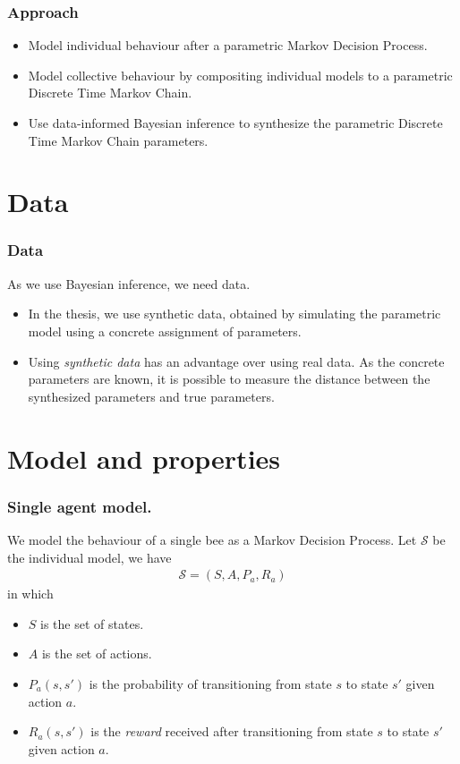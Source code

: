 \documentclass{beamer}
\begin{document}
\begin{frame}
  \frametitle{Approach}
  \begin{itemize}
    \item Model individual behaviour after a parametric Markov Decision Process.
    \item Model collective behaviour by compositing individual models to a
          parametric Discrete Time Markov Chain.
    \item Use data-informed Bayesian inference to synthesize the parametric
          Discrete Time Markov Chain parameters.
  \end{itemize}
\end{frame}

\section{Data}
\begin{frame}
  \frametitle{Data}
  As we use Bayesian inference, we need data.
  \begin{itemize}
    \item In the thesis, we use synthetic data, obtained by simulating the
          parametric model using a concrete assignment of parameters.
    \item Using \textit{synthetic data} has an advantage over using real data.
          As the concrete parameters are known, it is possible to measure the
          distance between the synthesized parameters and true parameters.
  \end{itemize}
\end{frame}

\section{Model and properties}
\begin{frame}
  \frametitle{Single agent model.}
  We model the behaviour of a single bee as a Markov Decision Process. Let
  $\mathcal{S}$ be the individual model, we have
  \begin{align*}
    \mathcal{S} = (S, A, P_a, R_a)
  \end{align*}
  in which
  \begin{itemize}
    \item $S$ is the set of states.
    \item $A$ is the set of actions.
    \item $P_a(s,s')$ is the probability of transitioning from state $s$ to state
          $s'$ given action $a$.
    \item $R_a(s,s')$ is the \textit{reward} received after transitioning from
          state $s$ to state $s'$ given action $a$.
  \end{itemize}
\end{frame}
\end{document}
